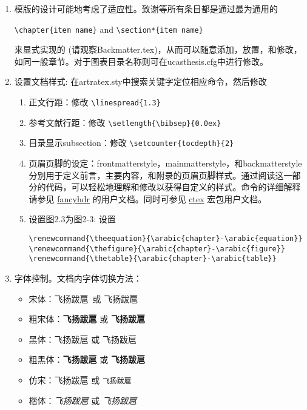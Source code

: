 \begin{enumerate}
    \item 模版的设计可能地考虑了适应性。致谢等所有条目都是通过最为通用的

        \verb+\chapter{item name}+  and \verb+\section*{item name}+

        来显式实现的 (请观察Backmatter.tex)，从而可以随意添加，放置，和修改，如同一般章节。对于图表目录名称则可在ucasthesis.cfg中进行修改。

    \item 设置文档样式: 在artratex.sty中搜索关键字定位相应命令，然后修改
        \begin{enumerate}
            \item 正文行距：修改 \verb|\linespread{1.3}|
            \item 参考文献行距：修改 \verb|\setlength{\bibsep}{0.0ex}|
            \item 目录显示subsection：修改 \verb|\setcounter{tocdepth}{2}|
            \item 页眉页脚的设定：frontmatterstyle，mainmatterstyle，和backmatterstyle分别用于定义前言，主要内容，和附录的页眉页脚样式。通过阅读这一部分的代码，可以轻松地理解和修改以获得自定义的样式。命令的详细解释请参见 \href{https://www.ctan.org/pkg/fancyhdr?lang=en}{fancyhdr} 的用户文档。同时可参见 \href{https://ctan.org/pkg/ctex?lang=en}{ctex} 宏包用户文档。

            \item 设置图2.3为图2-3: 设置
                {
                    \footnotesize
\begin{verbatim}
\renewcommand{\theequation}{\arabic{chapter}-\arabic{equation}}
\renewcommand{\thefigure}{\arabic{chapter}-\arabic{figure}}
\renewcommand{\thetable}{\arabic{chapter}-\arabic{table}}
\end{verbatim}
                }
        \end{enumerate}

    \item 字体控制。文档内字体切换方法：
        \begin{itemize}
            \item 宋体：飞扬跋扈~或 \textrm{飞扬跋扈}
            \item 粗宋体：{\bfseries 飞扬跋扈} 或 \textbf{飞扬跋扈}
            \item 黑体：{\sffamily 飞扬跋扈} 或 \textsf{飞扬跋扈}
            \item 粗黑体：{\bfseries\sffamily 飞扬跋扈} 或 \textsf{\bfseries 飞扬跋扈}
            \item 仿宋：{\ttfamily 飞扬跋扈} 或 \texttt{飞扬跋扈}
            \item 楷体：{\itshape 飞扬跋扈} 或 \textit{飞扬跋扈}
        \end{itemize}
        

\end{enumerate}
